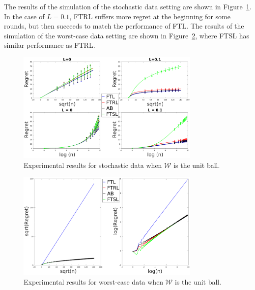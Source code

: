 \documentclass[english]{article}
\newcommand{\cW}{\mathcal{W}}
\begin{document}
The results of the simulation of the stochastic data setting are shown in Figure~\ref{res:Stoc_unitBall}. In the case of $L=0.1$, FTRL suffers more regret at the beginning for some rounds, but then succeeds to match the performance of FTL.
The results of the simulation of the worst-case data setting are shown in Figure~\ref{res:WorstCase_unitBall}, where FTSL has similar performance as FTRL.
\begin{figure}[h]
	\centering
	\includegraphics[width=0.8\textwidth]{figures/ExpResults/Stoc_unitBall}	
	\caption{Experimental results for stochastic data when $\cW$ is the unit ball. \label{res:Stoc_unitBall}}
\end{figure}

\begin{figure}[h]
	\centering
	\includegraphics[width=0.8\textwidth]{figures/ExpResults/WorstCase_unitBall}	
	\caption{Experimental results for worst-case data when $\cW$ is the unit ball. \label{res:WorstCase_unitBall}}
\end{figure}
\end{document}
